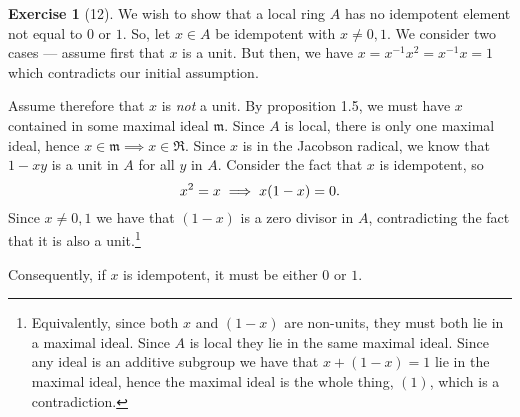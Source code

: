 \documentclass{article}
\theoremstyle{definition}
\newtheorem*{exercise}{Exercise}
\begin{document}
\begin{exercise}[12]
    We wish to show that a local ring $A$ has no idempotent element not
    equal to $0$ or $1$. So, let $x \in A$ be idempotent with $x \neq 0,
    1$. We consider two cases --- assume first that $x$ is a unit. But
    then, we have $x = x^{-1}x^2 = x^{-1}x = 1$ which contradicts our
    initial assumption.

    Assume therefore that $x$ is \emph{not} a unit. By proposition
    1.5, we must have $x$ contained in some maximal ideal
    $\mathfrak{m}$. Since $A$ is local, there is only one maximal
    ideal, hence $x \in \mathfrak{m} \implies x \in \mathfrak{R}$.
    Since $x$ is in the Jacobson radical, we know that $1 - xy$ is a
    unit in $A$ for all $y$ in $A$. Consider the fact that $x$ is
    idempotent, so
    \begin{equation}
        \notag
        x^2 = x \implies x(1 - x) = 0.
    \end{equation}
    Since $x \neq 0, 1$ we have that $(1 - x)$ is a zero divisor in
    $A$, contradicting the fact that it is also a
    unit.\footnote{Equivalently, since both $x$ and $(1 - x)$ are
        non-units, they must both lie in a maximal ideal. Since
        $A$ is local they lie in the same maximal ideal. Since any
        ideal is an additive subgroup we have that $x + (1 - x) = 1$ lie
        in the maximal ideal, hence the maximal ideal is the whole thing, $(1)$,
    which is a contradiction.}

    Consequently, if $x$ is idempotent, it must be either $0$ or $1$.
\end{exercise}
\end{document}

